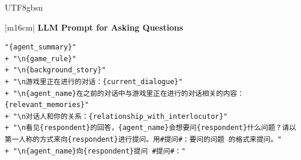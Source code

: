\documentclass[11pt]{article}
\begin{document}
{\begin{CJK}{UTF8}{gbsn}
\begin{table}[ht!]
\centering
\begin{tabular}{|m{16cm}|}
\hline
{}  {\textbf{LLM Prompt for Asking Questions}} \\
\hline
\begin{minipage}[t]{\linewidth}
\small\begin{verbatim}
"{agent_summary}"
+ "\n{game_rule}"
+ "\n{background_story}"
+ "\n游戏里正在进行的对话：{current_dialogue}"
+ "\n{agent_name}在之前的对话中与游戏里正在进行的对话相关的内容：{relevant_memories}"
+ "\n对话人和你的关系：{relationship_with_interlocutor}"
+ "\n看见{respondent}的回答，{agent_name}会想要问{respondent}什么问题？请以第一人称的方式来向{respondent}进行提问。用#提问#：要问的问题 的格式来提问。"
+ "\n{agent_name}向{respondent}提问 #提问#："


\end{verbatim}
\end{minipage}
\end{tabular}
\end{table}
\end{CJK}}
\end{document}
